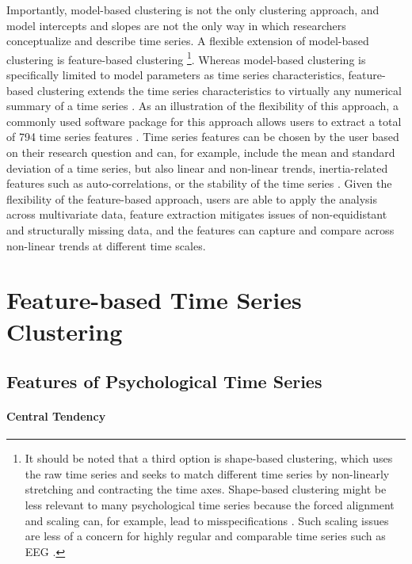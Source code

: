 \documentclass[man, 12pt, a4paper, mask]{apa7}
\theoremstyle{break}
\theoremstyle{plain}
\begin{document}
Importantly, model-based clustering is not the only clustering approach, and model intercepts and slopes are not the only way in which researchers conceptualize and describe time series. A flexible extension of model-based clustering is feature-based clustering \citep[e.g.,][]{Aghabozorgi2015}\footnote{It should be noted that a third option is shape-based clustering, which uses the raw time series and seeks to match different time series by non-linearly stretching and contracting the time axes. Shape-based clustering might be less relevant to many psychological time series because the forced alignment and scaling can, for example, lead to misspecifications \citep[e.g., ][]{faloutsos1994}. Such scaling issues are less of a concern for highly regular and comparable time series such as EEG \citep[][]{huang1985}.}. Whereas model-based clustering is specifically limited to model parameters as time series characteristics, feature-based clustering extends the time series characteristics to virtually any numerical summary of a time series \citep[e.g.,][]{liao2005}. As an illustration of the flexibility of this approach, a commonly used software package for this approach allows users to extract a total of 794 time series features \citep[][]{christ2018}. Time series features can be chosen by the user based on their research question and can, for example, include the mean and standard deviation of a time series, but also linear and non-linear trends, inertia-related features such as auto-correlations, or the stability of the time series \citep[e.g., mean absolute change; e.g.,][]{barandas2020}. Given the flexibility of the feature-based approach, users are able to apply the analysis across multivariate data, feature extraction mitigates issues of non-equidistant and structurally missing data, and the features can capture and compare across non-linear trends at different time scales.

\section{Feature-based Time Series Clustering}

\subsection{Features of Psychological Time Series}

\paragraph{Central Tendency}
\end{document}

